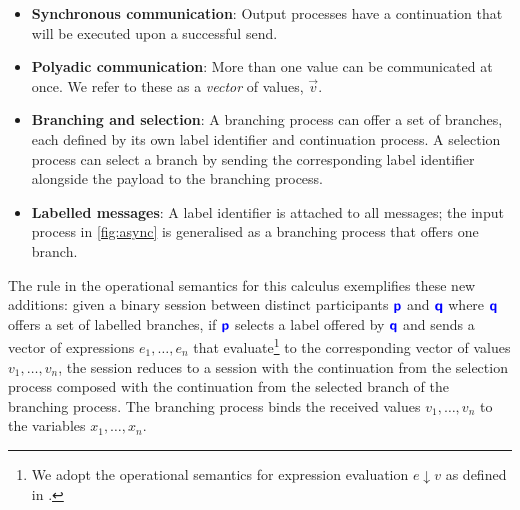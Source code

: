 \begin{itemize}
\item \textbf{Synchronous communication}: 
Output processes have a continuation that will be executed upon
a successful send.

\item \textbf{Polyadic communication}: 
More than one value can be communicated at once.
We refer to these as a \textit{vector} of values, $\vec v$.

\item \textbf{Branching and selection}: 
A branching process can offer a set of branches, 
each defined by its own label identifier and continuation process. 
A selection process can select a branch by 
sending the corresponding label identifier 
alongside the payload to the branching process.

\item \textbf{Labelled messages}: 
A label identifier is attached to all messages; 
the input process in \cref{fig:async}
is generalised as a branching process that offers one branch.
\end{itemize}

The  rule in the operational semantics 
for this calculus exemplifies these new additions: 
given a binary session between distinct participants 
$\role{p}$ and $\role{q}$ 
where $\role{q}$ offers a set of labelled branches,
if $\role{p}$ selects a label offered by $\role{q}$ and 
sends a vector of expressions $e_1, \dots, e_n$ 
that evaluate\footnote{
We adopt the operational semantics for 
expression evaluation $e \downarrow v$ 
as defined in \cite{C406Lecture}.
} to the corresponding vector of values 
$v_1, \dots, v_n$, 
the session reduces to a session with 
the continuation from the selection process 
composed with the continuation from the selected branch 
of the branching process.
The branching process binds the received values
$v_1, \dots, v_n$ to the variables $x_1, \dots, x_n$.

\begin{prooftree}
\end{prooftree}

